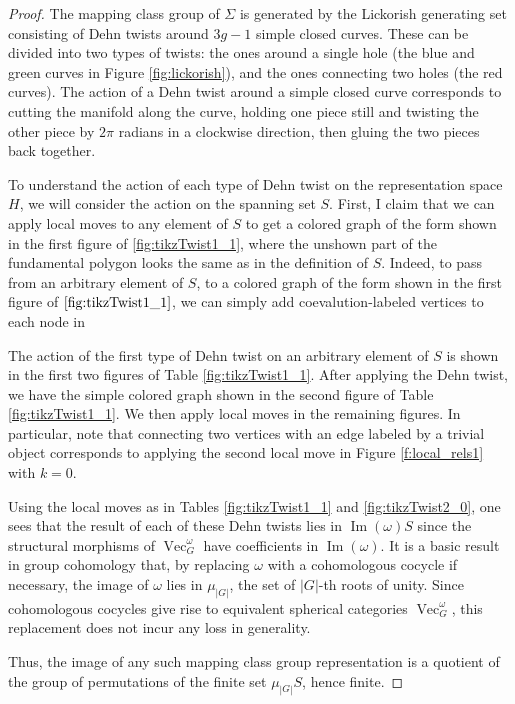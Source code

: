\documentclass{amsart}
\DeclareMathOperator{\Vect}{Vec}
\DeclareMathOperator{\Img}{Im}
\newcommand{\Si}{\Sigma}
\begin{document}
\begin{proof}
The mapping class group of $\Si$ is generated by the Lickorish generating set consisting of Dehn twists around $3g-1$ simple closed curves.   These can be divided into two types of twists: the ones around a single hole (the blue and green curves in Figure \ref{fig:lickorish}), and the ones connecting two holes (the red curves). The action of a Dehn twist around a simple closed curve corresponds to cutting the manifold along the curve, holding one piece still and twisting the other piece by $2\pi$ radians in a clockwise direction, then gluing the two pieces back together.


To understand the action of each type of Dehn twist on the representation space $H$, we will consider the action on the spanning set $S$.  First, I claim that we can apply local moves to any element of $S$ to get a colored graph of the form shown in the first figure of \ref{fig:tikzTwist1_1}, where the unshown part of the fundamental polygon looks the same as in the definition of $S$.  Indeed, to pass from an arbitrary element of $S$, to a colored graph of the form shown in the first figure of $\ref{fig:tikzTwist1_1}$, we can simply add coevalution-labeled vertices to each node in

The action of the first type of Dehn twist on an arbitrary element of $S$ is shown in the first two figures of Table \ref{fig:tikzTwist1_1}.  
After applying the Dehn twist, we have the simple colored graph shown in the second figure of Table \ref{fig:tikzTwist1_1}.  We then apply local moves in the remaining figures.  In particular, note that connecting two vertices with an edge labeled by a trivial object corresponds to applying the second local move in Figure \ref{f:local_rels1} with  $k = 0$.


Using the local moves as in Tables \ref{fig:tikzTwist1_1} and \ref{fig:tikzTwist2_0}, one sees that the result of each of these Dehn twists lies in $\Img(\omega) S$ since the structural morphisms of $\Vect_G^\omega$ have coefficients in $\Img(\omega)$.  It is a basic result in group cohomology that, by replacing $\omega$ with a cohomologous cocycle if necessary,  the image of $\omega$ lies in $\mu_{|G|}$, the set of $|G|$-th roots of unity.  Since cohomologous cocycles give rise to equivalent spherical categories $\Vect_G^\omega$, this replacement does not incur any loss in generality.

Thus, the image of any such mapping class group representation is a quotient of the group of permutations of the finite set $\mu_{|G|} S$, hence finite.
\end{proof}
\end{document}
